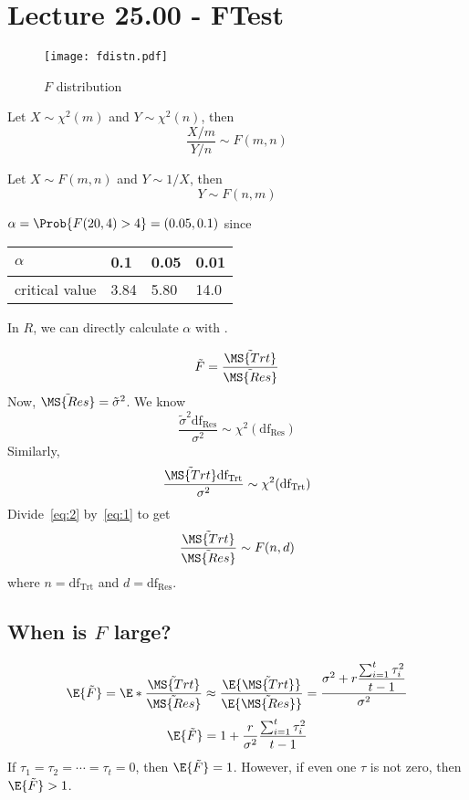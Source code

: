 \section{Lecture 25.00 - FTest}
\begin{figure}[!htbp]
    \centering
    \texttt{[image: fdistn.pdf]}
    \caption{$ F $ distribution}
\end{figure}
\begin{Theorem}{}{}
    Let $ X \sim \chi^2(m) $ and $ Y \sim \chi^2(n) $, then
    \[ \frac{X/m}{Y/n} \sim F(m,n) \]
\end{Theorem}
\begin{Theorem}{}{}
    Let $ X \sim F(m,n) $ and $ Y \sim 1/X $, then
    \[ Y \sim F(n,m) \]
\end{Theorem}
\begin{Example}{}{}
    $ \alpha=\Prob{F(20,4)>4}=(0.05,0.1) $ since
    \begin{center}
        \begin{tabularx}{0.7\linewidth}{@{}YYYY@{}}
            $\alpha$       & 0.1  & 0.05 & 0.01 \\
            \midrule
            critical value & 3.84 & 5.80 & 14.0
        \end{tabularx}
    \end{center}
    In $ R $, we can directly calculate $ \alpha $ with .
\end{Example}
\[ \tilde{F}=\frac{\tilde{\MS{Trt}}}{\tilde{\MS{Res}}}  \]
Now, $ \tilde{\MS{Res}}=\tilde{\sigma}^2 $. We know
\begin{equation}\label{eq:1}
    \frac{\tilde{\sigma}^2\text{df}_\text{Res}}{\sigma^2} \sim \chi^2(\text{df}_{\text{Res}})
\end{equation}
Similarly,
\begin{equation}\label{eq:2}
    \frac{\tilde{\MS{Trt}}\text{df}_\text{Trt}}{\sigma^2} \sim \chi^2(\text{df}_\text{Trt})
\end{equation}
Divide~\ref{eq:2} by~\ref{eq:1} to get
\[ \frac{\tilde{\MS{Trt}}}{\tilde{\MS{Res}}} \sim F(n,d) \]
where $ n=\text{df}_\text{Trt} $ and $ d=\text{df}_\text{Res} $.

\subsection*{When is $ F $ large?}
\[ \E{\tilde{F}}=
    \E*{\frac{\tilde{\MS{Trt}}}{\tilde{\MS{Res}}}}\approx
    \frac{\E{\tilde{\MS{Trt}}}}{\E{\tilde{\MS{Res}}}}
    =\frac{\sigma^2+r \dfrac{\sum_{i=1}^t \tau_i^2}{t-1} }{\sigma^2}  \]
\[ \E{\tilde{F}}=1+\frac{r}{\sigma^2} \frac{\sum_{i=1}^t \tau_i^2 }{t-1}  \]
If $ \tau_1=\tau_2=\cdots=\tau_t=0 $, then $ \E{\tilde{F}}=1 $.
However, if even one $ \tau $ is not zero, then $ \E{\tilde{F}}>1 $.

